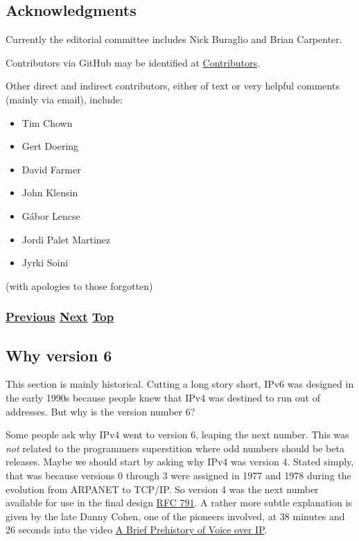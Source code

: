 \documentclass[
]{article}
\begin{document}
\pagebreak

\subsection{Acknowledgments}\label{acknowledgments}

Currently the editorial committee includes Nick Buraglio and Brian
Carpenter.

Contributors via GitHub may be identified at
\href{https://github.com/becarpenter/book6/graphs/contributors}{Contributors}.

Other direct and indirect contributors, either of text or very helpful
comments (mainly via email), include:

\begin{itemize}
\item
  Tim Chown
\item
  Gert Doering
\item
  David Farmer
\item
  John Klensin
\item
  Gábor Lencse
\item
  Jordi Palet Martinez
\item
  Jyrki Soini
\end{itemize}

(with apologies to those forgotten)

\subsubsection{\texorpdfstring{\hyperref[how-to-contribute]{Previous}
\hyperref[why-version-6]{Next}
\hyperref[introduction-and-foreword]{Top}}{Previous Next Top}}\label{previous-next-top-6}

\pagebreak

\subsection{Why version 6}\label{why-version-6}

This section is mainly historical. Cutting a long story short, IPv6 was
designed in the early 1990s because people knew that IPv4 was destined
to run out of addresses. But why is the version number 6?

Some people ask why IPv4 went to version 6, leaping the next number.
This was \emph{not} related to the programmer\textquotesingle s
superstition where odd numbers should be beta releases. Maybe we should
start by asking why IPv4 was version 4. Stated simply, that was because
versions 0 through 3 were assigned in 1977 and 1978 during the evolution
from ARPANET to TCP/IP. So version 4 was the next number available for
use in the final design
\href{https://www.rfc-editor.org/info/rfc791}{RFC 791}. A rather more
subtle explanation is given by the late Danny Cohen, one of the pioneers
involved, at 38 minutes and 26 seconds into the video
\href{https://youtu.be/av4KF1j-wp4}{A Brief Prehistory of Voice over
IP}.
\end{document}
